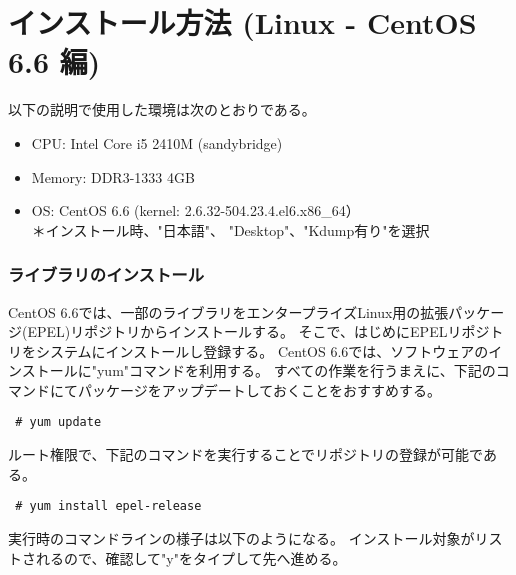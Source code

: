 \section{インストール方法 (Linux - CentOS 6.6 編)} \label{chap:install_centos}

以下の説明で使用した環境は次のとおりである。
\begin{itemize}
\item CPU: Intel Core i5 2410M (sandybridge)
\item Memory: DDR3-1333 4GB
\item OS: CentOS 6.6 (kernel: 2.6.32-504.23.4.el6.x86\_64）\\
{\small ＊インストール時、"日本語"、 "Desktop"、"Kdump有り"を選択}
\end{itemize}

\subsubsection{ライブラリのインストール}

CentOS 6.6では、一部のライブラリをエンタープライズLinux用の拡張パッケージ(EPEL)リポジトリからインストールする。
そこで、はじめにEPELリポジトリをシステムにインストールし登録する。
CentOS 6.6では、ソフトウェアのインストールに"yum"コマンドを利用する。
すべての作業を行うまえに、下記のコマンドにてパッケージをアップデートしておくことをおすすめする。
\begin{verbatim}
 # yum update
\end{verbatim}

ルート権限で、下記のコマンドを実行することでリポジトリの登録が可能である。
\begin{verbatim}
 # yum install epel-release
\end{verbatim}
実行時のコマンドラインの様子は以下のようになる。
インストール対象がリストされるので、確認して"y"をタイプして先へ進める。\\

